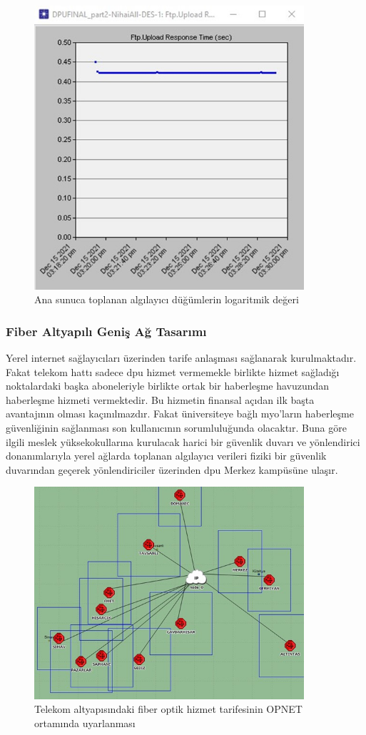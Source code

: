 \begin{figure}[htbp]
\centerline{\includegraphics[width=10cm]{Resim/sekil4-37.jpg}}
\caption{Ana sunuca toplanan algılayıcı düğümlerin logaritmik değeri}
\label{fig:4-38}
\end{figure}


\subsubsection{Fiber Altyapılı Geniş Ağ Tasarımı}\label{fibeeraciklama}


Yerel internet sağlayıcıları üzerinden tarife anlaşması sağlanarak kurulmaktadır. Fakat telekom hattı sadece \gls{dpu} hizmet vermemekle birlikte hizmet sağladığı noktalardaki başka aboneleriyle birlikte ortak bir haberleşme havuzundan haberleşme hizmeti vermektedir. Bu hizmetin finansal açıdan ilk başta avantajının olması kaçınılmazdır. Fakat üniversiteye bağlı \gls{myo}'ların haberleşme güvenliğinin sağlanması son kullanıcının sorumluluğunda olacaktır. Buna göre ilgili meslek yüksekokullarına kurulacak harici bir güvenlik duvarı ve yönlendirici donanımlarıyla yerel ağlarda toplanan algılayıcı verileri fiziki bir güvenlik duvarından geçerek yönlendiriciler üzerinden \gls{dpu} Merkez kampüsüne ulaşır.


\begin{figure}[htbp]
\centerline{\includegraphics[width=10cm]{Resim/sekil4-39.jpg}}
\caption{Telekom altyapısındaki fiber optik hizmet tarifesinin OPNET ortamında uyarlanması}
\label{fig:4-39}
\end{figure}

